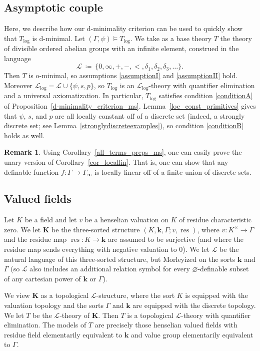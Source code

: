 \documentclass[11pt]{amsart}
\theoremstyle{plain}
\theoremstyle{definition}
\newtheorem{remark}[thm]{Remark}
\numberwithin{equation}{section}
\newcommand\calL{\mathcal{L}}
\newcommand\0{\varnothing}
\renewcommand\L{\mathcal{L}}
\renewcommand\k{\boldsymbol{k}}
\DeclareMathOperator\res{res}
\begin{document}
\subsection{Asymptotic couple}\label{subsec_asympdmin}

Here, we describe how our d-minimality criterion can be used to quickly show that $T_{\log}$ is d-minimal. Let $(\Gamma,\psi) \models T_{\log}$. We take as a base theory $T$ the theory of divisible ordered abelian groups with an infinite element, construed in the language 
\[
\calL\ \coloneqq\ \{0,\infty,+,-,<,\delta_1,\delta_2,\delta_3,\ldots\}.
\]
Then $T$ is o-minimal, so assumptions \ref{assumptionI} and \ref{assumptionII} hold. 
Moreover $\calL_{\log} = \calL \cup \{\psi,s,p\}$, so $T_{\log}$ is an $\calL_{\log}$-theory with quantifier elimination and a universal axiomatization. In particular, $T_{\log}$ satisfies condition \ref{conditionA} of Proposition~\ref{d-minimality_criterion_ms}. Lemma~\ref{loc_const_primitives} gives that $\psi$, $s$, and $p$ are all locally constant off of a discrete set  (indeed, a strongly discrete set; see Lemma~\ref{stronglydiscreteexamples}), so condition \ref{conditionB} holds as well.

\begin{remark}
Using Corollary~\ref{all_terms_preps_ms}, one can easily prove the unary version of Corollary~\ref{cor_locallin}. That is, one can show that any definable function $f \colon \Gamma\to \Gamma_\infty$ is locally linear off of a finite union of discrete sets.
\end{remark}

\subsection{Valued fields}\label{subsec_valueddmin}
Let $K$ be a field and let $v$ be a henselian valuation on $K$ of residue characteristic zero. We let $\bm{K}$ be the three-sorted structure $(K,\k,\Gamma; v,\res)$, where $v \colon K^\times \to \Gamma$ and the residue map $\res\colon K\to \k$ are assumed to be surjective (and where the residue map sends everything with negative valuation to 0). We let $\L$ be the natural language of this three-sorted structure, but Morleyized on the sorts $\k$ and $\Gamma$ (so $\L$ also includes an additional relation symbol for every $\varnothing$-definable subset of any cartesian power of $\k$ or $\Gamma$).

\medskip\noindent
We view $\bm{K}$ as a topological $\L$-structure, where the sort $K$ is equipped with the valuation topology and the sorts $\Gamma$ and $\k$ are equipped with the discrete topology. 
We let $T$ be the $\L$-theory of $\bm{K}$. Then $T$ is a topological $\L$-theory with quantifier elimination. The models of $T$ are precisely those  henselian valued fields with residue field elementarily equivalent to $\k$ and value group elementarily equivalent to $\Gamma$. 
\end{document}

